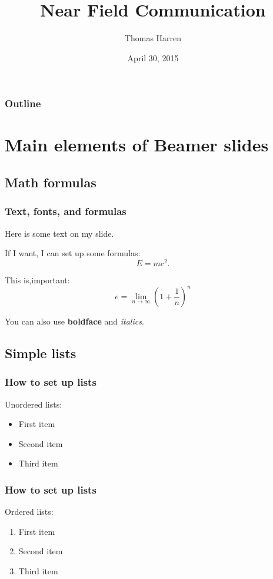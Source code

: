 \documentclass{beamer}
\begin{document}
\title{Near Field Communication}
\author{Thomas Harren}
\date[]  
{April 30, 2015}

\begin{frame}
  \titlepage
\end{frame}

\begin{frame}

  \frametitle{Outline}
\tableofcontents
\end{frame}

\section{Main elements of Beamer slides}

\subsection{Math formulas}

\begin{frame}
  \frametitle{Text, fonts, and formulas}
Here is some text on my slide. 

If I want, I can set up some formulas:
$$
E = mc^2.
$$

This is,\alert{important}:
\[
e = \lim_{n \to \infty} {\left( 1 + \frac{1}{n} \right)}^n
\]

You can also use \textbf{boldface} and \textit{italics}. 
\end{frame}

\subsection{Simple lists}

\begin{frame}
  \frametitle{How to set up lists}
Unordered lists:
\begin{itemize}
\item First item 
\item Second item
\item Third item
\end{itemize}
\end{frame}

\begin{frame}
  \frametitle{How to set up lists}
Ordered lists:
\begin{enumerate}
\item First item 
\item Second item
\item Third item
\end{enumerate}
\end{frame}
\end{document}
